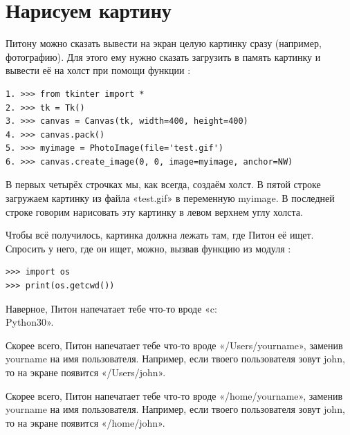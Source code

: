 \section{Нарисуем картину}

Питону можно сказать вывести на экран целую картинку сразу (например, фотографию). Для этого ему нужно сказать загрузить в память картинку и вывести её на холст при помощи функции :

\begin{listing}
\begin{verbatim}
1. >>> from tkinter import *
2. >>> tk = Tk()
3. >>> canvas = Canvas(tk, width=400, height=400)
4. >>> canvas.pack()
5. >>> myimage = PhotoImage(file='test.gif')
6. >>> canvas.create_image(0, 0, image=myimage, anchor=NW)
\end{verbatim}
\end{listing}

В первых четырёх строчках мы, как всегда, создаём холст. В пятой строке загружаем картинку из файла «test.gif» в переменную myimage. В последней строке говорим  нарисовать эту картинку в левом верхнем углу холста.

Чтобы всё получилось, картинка должна лежать там, где Питон её ищет. Спросить у него, где он ищет, можно, вызвав функцию  из модуля :

\begin{listing}
\begin{verbatim}
>>> import os
>>> print(os.getcwd())
\end{verbatim}
\end{listing}

\begin{WINDOWS}
Наверное, Питон напечатает тебе что-то вроде «c:\\Python30».
\end{WINDOWS}

\begin{MAC}
Скорее всего, Питон напечатает тебе что-то вроде «/Users/yourname», заменив yourname на имя пользователя. Например, если твоего пользователя зовут john, то на экране появится «/Users/john».
\end{MAC}

\begin{LINUX}
Скорее всего, Питон напечатает тебе что-то вроде «/home/yourname», заменив yourname на имя пользователя. Например, если твоего пользователя зовут john, то на экране появится «/home/john».
\end{LINUX}

